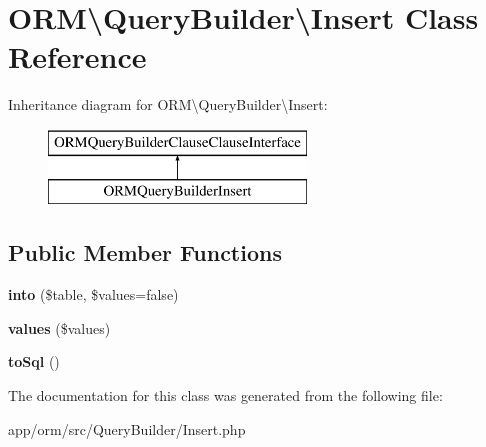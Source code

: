 \hypertarget{classORM_1_1QueryBuilder_1_1Insert}{}\section{O\+RM\textbackslash{}Query\+Builder\textbackslash{}Insert Class Reference}
\label{classORM_1_1QueryBuilder_1_1Insert}
Inheritance diagram for O\+RM\textbackslash{}Query\+Builder\textbackslash{}Insert\+:\begin{figure}[H]
\begin{center}
\leavevmode
\includegraphics[height=2.000000cm]{classORM_1_1QueryBuilder_1_1Insert}
\end{center}
\end{figure}
\subsection*{Public Member Functions}
\begin{DoxyCompactItemize}
\item 
{\bfseries into} (\$table, \$values=false)\hypertarget{classORM_1_1QueryBuilder_1_1Insert_a6f3684a358d8d95f4875a0bb339ae373}{}\label{classORM_1_1QueryBuilder_1_1Insert_a6f3684a358d8d95f4875a0bb339ae373}

\item 
{\bfseries values} (\$values)\hypertarget{classORM_1_1QueryBuilder_1_1Insert_aeaa8cf2d5d69755eba9999a8d3e42e6e}{}\label{classORM_1_1QueryBuilder_1_1Insert_aeaa8cf2d5d69755eba9999a8d3e42e6e}

\item 
{\bfseries to\+Sql} ()\hypertarget{classORM_1_1QueryBuilder_1_1Insert_ab72e936fbe94621967aa440f6077ae67}{}\label{classORM_1_1QueryBuilder_1_1Insert_ab72e936fbe94621967aa440f6077ae67}

\end{DoxyCompactItemize}


The documentation for this class was generated from the following file\+:\begin{DoxyCompactItemize}
\item 
app/orm/src/\+Query\+Builder/Insert.\+php\end{DoxyCompactItemize}
